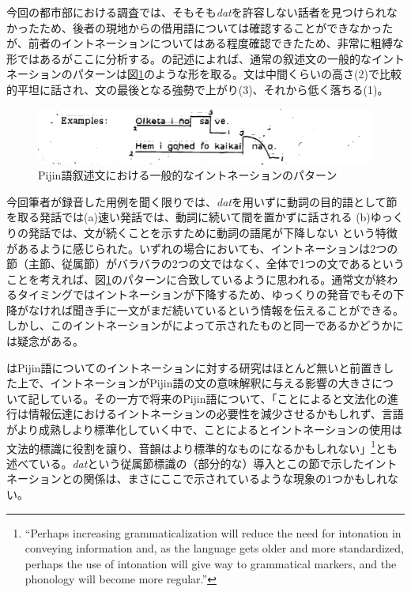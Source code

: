 今回の都市部における調査では、そもそも\textit{dat}を許容しない話者を見つけられなかったため、後者の現地からの借用語については確認することができなかったが、前者のイントネーションについてはある程度確認できたため、非常に粗縛な形ではあるがここに分析する。\cite{eric}の記述によれば、通常の叙述文の一般的なイントネーションのパターンは図\ref{fig:intonation}のような形を取る。文は中間くらいの高さ(2)で比較的平坦に話され、文の最後となる強勢で上がり(3)、それから低く落ちる(1)。

\begin{figure}[ht]
  \includegraphics[width=15cm]{./intonation.png}
  \caption{Pijin語叙述文における一般的なイントネーションのパターン\cite[10]{eric}}
  \label{fig:intonation}
\end{figure}

今回筆者が録音した用例を聞く限りでは、\textit{dat}を用いずに動詞の目的語として節を取る発話では(a)速い発話では、動詞に続いて間を置かずに話される (b)ゆっくりの発話では、文が続くことを示すために動詞の語尾が下降しない という特徴があるように感じられた。いずれの場合においても、イントネーションは2つの節（主節、従属節）がバラバラの2つの文ではなく、全体で1つの文であるということを考えれば、図\ref{fig:intonation}のパターンに合致しているように思われる。通常文が終わるタイミングではイントネーションが下降するため、ゆっくりの発音でもその下降がなければ聞き手に一文がまだ続いているという情報を伝えることができる。しかし、このイントネーションが\cite{eric}によって示されたものと同一であるかどうかには疑念がある。

\cite{phonology}はPijin語についてのイントネーションに対する研究はほとんど無いと前置きした上で、イントネーションがPijin語の文の意味解釈に与える影響の大きさについて記している。その一方で将来のPijin語について、「ことによると文法化の進行は情報伝達におけるイントネーションの必要性を減少させるかもしれず、言語がより成熟しより標準化していく中で、ことによるとイントネーションの使用は文法的標識に役割を譲り、音韻はより標準的なものになるかもしれない」\footnote{``Perhaps increasing grammaticalization will reduce the need for intonation in conveying information and, as the language gets older and more standardized, perhaps the use of intonation will give way to grammatical markers, and the phonology will become more regular.''\citep{phonology}}とも述べている。\textit{dat}という従属節標識の（部分的な）導入とこの節で示したイントネーションとの関係は、まさにここで示されているような現象の1つかもしれない。

